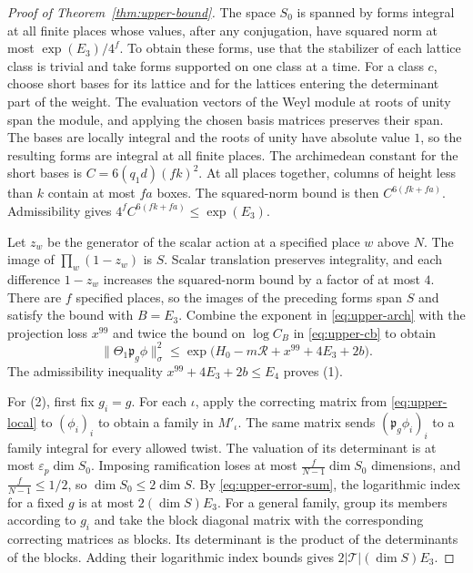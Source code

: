 \begin{proof}[Proof of Theorem~\ref{thm:upper-bound}]
The space \(S_0\) is spanned by forms integral at all finite places
whose values, after any conjugation, have squared norm at most
\(\exp(E_3)/4^f\). To obtain these forms, use that the stabilizer of
each lattice class is trivial and take forms supported on one class
at a time. For a class \(c\), choose short bases for its lattice and
for the lattices entering the determinant part of the weight.
The evaluation vectors of the Weyl module at roots of unity span the
module, and applying the chosen basis matrices preserves their span.
The bases are locally integral and the roots of unity have absolute
value \(1\), so the resulting forms are integral at all finite places.
The archimedean constant for the short bases is \(C=6(q_1d)(fk)^2\).
At all places together, columns of height less than \(k\) contain at
most \(fa\) boxes. The squared-norm bound is then \(C^{6(fk+fa)}\).
Admissibility gives \(4^f C^{6(fk+fa)}\le\exp(E_3)\).

Let \(z_w\) be the generator of the scalar action at a specified place
\(w\) above \(N\). The image of \(\prod_w(1-z_w)\) is \(S\).
Scalar translation preserves integrality, and each difference
\(1-z_w\) increases the squared-norm bound by a factor of at most \(4\).
There are \(f\) specified places, so the images of the preceding forms
span \(S\) and satisfy the bound with \(B=E_3\).
Combine the exponent in \eqref{eq:upper-arch} with the projection
loss \(x^{99}\) and twice the bound on \(\log C_B\) in
\eqref{eq:upper-cb} to obtain
\[
 \|\Theta_1\mathfrak p_g\phi\|_\sigma^2
 \le \exp\bigl(H_0-m\mathcal R+x^{99}+4E_3+2b\bigr).
\]
The admissibility inequality \(x^{99}+4E_3+2b\le E_4\) proves (1).

For (2), first fix \(g_i=g\).
For each \(\iota\), apply the correcting matrix from
\eqref{eq:upper-local} to \((\phi_i)_i\) to obtain a family in \(M'_\iota\).
The same matrix sends \((\mathfrak p_g\phi_i)_i\) to a family integral
for every allowed twist. The valuation of its determinant is at most
\(\varepsilon_p\dim S_0\).
Imposing ramification loses at most \(\frac{f}{N-1}\dim S_0\)
dimensions, and \(\frac{f}{N-1}\le1/2\), so \(\dim S_0\le2\dim S\).
By \eqref{eq:upper-error-sum}, the logarithmic index for a fixed \(g\)
is at most \(2(\dim S)E_3\).
For a general family, group its members according to \(g_i\) and take
the block diagonal matrix with the corresponding correcting matrices
as blocks. Its determinant is the product of the determinants of the
blocks. Adding their logarithmic index bounds gives
\(2|\mathcal T|(\dim S)E_3\).
\end{proof}
